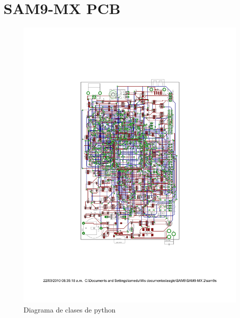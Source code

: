 \chapter{SAM9-MX PCB}\label{ch:pcb}


\begin{figure}[!h]

\includegraphics[scale=0.7]{appendix/SAM9-PCBAppe}\caption{Diagrama de clases de python}
\label{Flo:pcb}

\end{figure}

